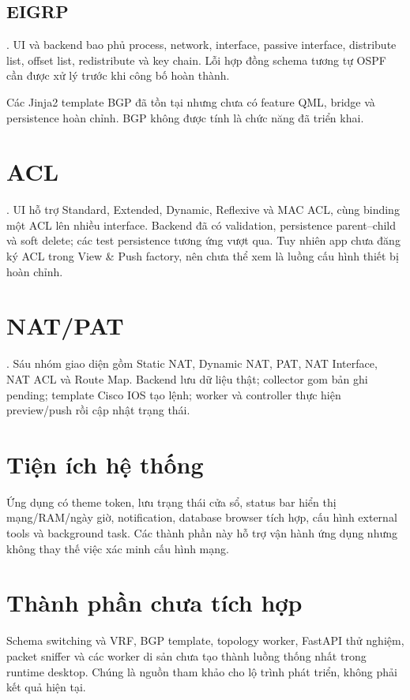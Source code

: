 \subsection{EIGRP}

\statuspartial. UI và backend bao phủ process, network, interface, passive interface, distribute list, offset list, redistribute và key chain. Lỗi hợp đồng schema tương tự OSPF cần được xử lý trước khi công bố hoàn thành.

\begin{reportnote}
Các Jinja2 template BGP đã tồn tại nhưng chưa có feature QML, bridge và persistence hoàn chỉnh. BGP không được tính là chức năng đã triển khai.
\end{reportnote}

\section{ACL}

\statuspartial. UI hỗ trợ Standard, Extended, Dynamic, Reflexive và MAC ACL, cùng binding một ACL lên nhiều interface. Backend đã có validation, persistence parent--child và soft delete; các test persistence tương ứng vượt qua. Tuy nhiên app chưa đăng ký ACL trong View \& Push factory, nên chưa thể xem là luồng cấu hình thiết bị hoàn chỉnh.

\section{NAT/PAT}

\statusdone. Sáu nhóm giao diện gồm Static NAT, Dynamic NAT, PAT, NAT Interface, NAT ACL và Route Map. Backend lưu dữ liệu thật; collector gom bản ghi pending; template Cisco IOS tạo lệnh; worker và controller thực hiện preview/push rồi cập nhật trạng thái.

\section{Tiện ích hệ thống}

Ứng dụng có theme token, lưu trạng thái cửa sổ, status bar hiển thị mạng/RAM/ngày giờ, notification, database browser tích hợp, cấu hình external tools và background task. Các thành phần này hỗ trợ vận hành ứng dụng nhưng không thay thế việc xác minh cấu hình mạng.

\section{Thành phần chưa tích hợp}

Schema switching và VRF, BGP template, topology worker, FastAPI thử nghiệm, packet sniffer và các worker di sản chưa tạo thành luồng thống nhất trong runtime desktop. Chúng là nguồn tham khảo cho lộ trình phát triển, không phải kết quả hiện tại.
